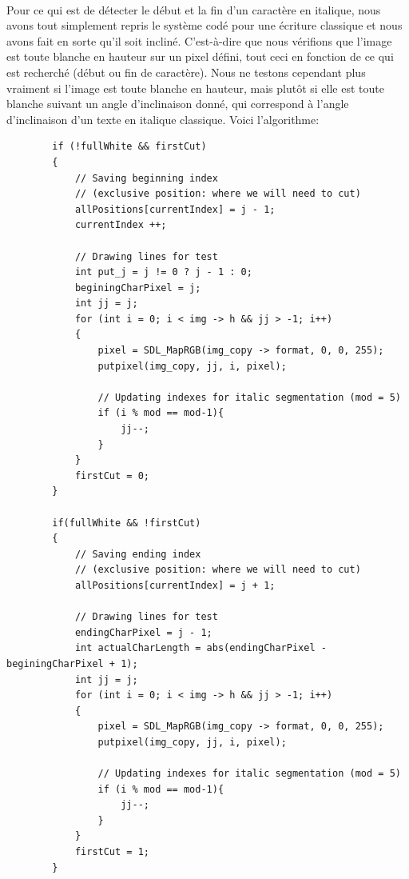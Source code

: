 \documentclass{article}
\begin{document}
    \paragraph{}
    Pour ce qui est de détecter le début et la fin d'un caractère en italique, nous avons tout simplement repris le système codé pour une écriture classique et nous avons fait en sorte qu'il soit incliné. C'est-à-dire que nous vérifions que l'image est toute blanche en hauteur sur un pixel défini, tout ceci en fonction de ce qui est recherché (début ou fin de caractère). Nous ne testons cependant plus vraiment si l'image est toute blanche en hauteur, mais plutôt si elle est toute blanche suivant un angle d'inclinaison donné, qui correspond à l'angle d'inclinaison d'un texte en italique classique. Voici l'algorithme: \\

    \begin{lstlisting}
        if (!fullWhite && firstCut)
        {
            // Saving beginning index 
            // (exclusive position: where we will need to cut)
            allPositions[currentIndex] = j - 1;
            currentIndex ++;

            // Drawing lines for test
            int put_j = j != 0 ? j - 1 : 0; 
            beginingCharPixel = j;
            int jj = j;
            for (int i = 0; i < img -> h && jj > -1; i++)
            {
                pixel = SDL_MapRGB(img_copy -> format, 0, 0, 255);
                putpixel(img_copy, jj, i, pixel);

                // Updating indexes for italic segmentation (mod = 5)
                if (i % mod == mod-1){
                    jj--;
                }
            }
            firstCut = 0;
        }
        
        if(fullWhite && !firstCut) 
        {
            // Saving ending index
            // (exclusive position: where we will need to cut)
            allPositions[currentIndex] = j + 1;

            // Drawing lines for test
            endingCharPixel = j - 1;
            int actualCharLength = abs(endingCharPixel - beginingCharPixel + 1);
            int jj = j;
            for (int i = 0; i < img -> h && jj > -1; i++)
            {
                pixel = SDL_MapRGB(img_copy -> format, 0, 0, 255);
                putpixel(img_copy, jj, i, pixel);

                // Updating indexes for italic segmentation (mod = 5)
                if (i % mod == mod-1){
                    jj--;
                }
            }
            firstCut = 1;
        }
    \end{lstlisting}
\end{document}

